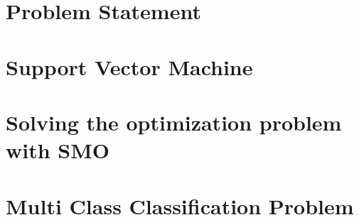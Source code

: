 \documentclass[12pt, a4paper, openany]{report} %
\theoremstyle{definition}
\numberwithin{equation}{chapter}
\begin{document}
\cleardoublepage
  \pagestyle{plain}

\chapter*{Problem Statement}




\chapter*{Support Vector Machine}




\chapter*{Solving the optimization problem with SMO}



\chapter*{Multi Class Classification Problem}





  

%  
\end{document}

